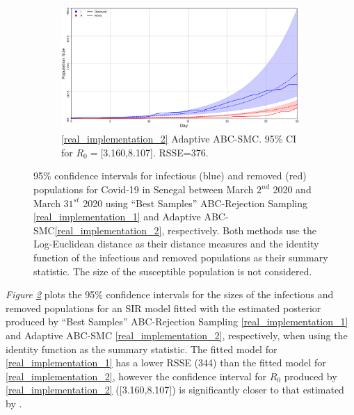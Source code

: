\documentclass[11pt,a4paper]{article}
\theoremstyle{break}
\begin{document}
\begin{figure}[H]
{\begin{subfigure}{.45\paperwidth}
        \includegraphics[width=\textwidth]{senegal_adapt_abc_smc_identity_ci.PNG}
        \caption{\ref{real_implementation_2} Adaptive ABC-SMC. 95\% CI for $R_0=$[3.160,8.107]. RSSE=376.}
        \label{fig_senegal_identity_ci_adapt_abc_smc}
      \end{subfigure}
    }
    \caption{95\% confidence intervals for infectious (blue) and removed (red) populations for Covid-19 in Senegal between March $2^{nd}$ 2020 and March $31^{st}$ 2020 using ``Best Samples'' ABC-Rejection Sampling \ref{real_implementation_1} and Adaptive ABC-SMC\ref{real_implementation_2}, respectively. Both methods use the Log-Euclidean distance as their distance measures and the identity function of the infectious and removed populations as their summary statistic. The size of the susceptible population is not considered.}
    \label{fig_senegal_identity_ci}
  \end{figure}

  \par \textit{Figure \ref{fig_senegal_identity_ci}} plots the 95\% confidence intervals for the sizes of the infectious and removed populations for an SIR model fitted with the estimated posterior produced by ``Best Samples'' ABC-Rejection Sampling \ref{real_implementation_1} and Adaptive ABC-SMC \ref{real_implementation_2}, respectively, when using the identity function as the summary statistic. The fitted model for \ref{real_implementation_1} has a lower RSSE (344) than the fitted model for \ref{real_implementation_2}, however the confidence interval for $R_0$ produced by \ref{real_implementation_2} ([3.160,8.107]) is significantly closer to that estimated by \cite[]{estimated_r0_covid_19}.
\end{document}
